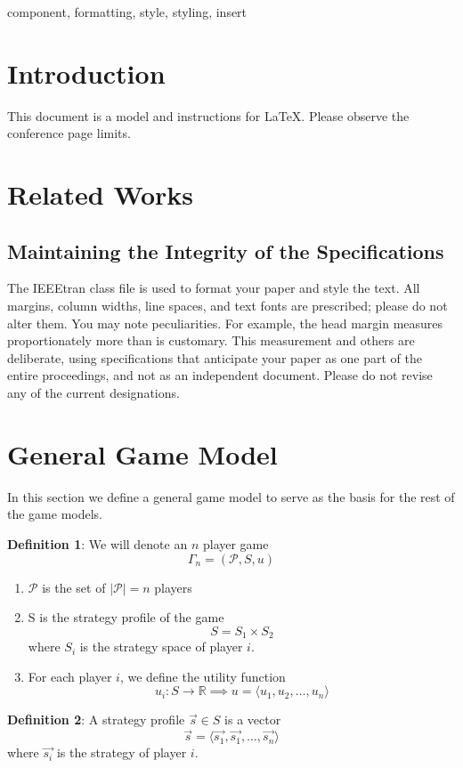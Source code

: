 \documentclass[conference]{IEEEtran}
\begin{document}
\begin{IEEEkeywords}
component, formatting, style, styling, insert
\end{IEEEkeywords}

\section{Introduction}
This document is a model and instructions for \LaTeX.
Please observe the conference page limits. 

\section{Related Works}

\subsection{Maintaining the Integrity of the Specifications}

The IEEEtran class file is used to format your paper and style the text. All margins, 
column widths, line spaces, and text fonts are prescribed; please do not 
alter them. You may note peculiarities. For example, the head margin
measures proportionately more than is customary. This measurement 
and others are deliberate, using specifications that anticipate your paper 
as one part of the entire proceedings, and not as an independent document. 
Please do not revise any of the current designations.
\fi
\section{General Game Model}
In this section we define a general game model to serve as the basis for the rest of the game models.

\textbf{Definition 1}: We will denote an $n$ player game $$\Gamma_n = (\mathcal{P}, S, u)$$
\begin{enumerate}
\item $\mathcal{P}$ is the set of $|\mathcal{P}| = n$ players
\item S is the strategy profile of the game $$S = S_1 \times S_2 $$ where $S_i$ is the strategy space of player $i$.
\item For each player $i$, we define the utility function $$u_i \mathpunct{:} S \to \mathbb{R} \implies u = \langle u_1, u_2, \ldots, u_n \rangle$$

\end{enumerate}

\textbf{Definition 2}: A strategy profile $\vec{s} \in S$ is a vector $$\vec{s} = \langle\vec{s_1}, \vec{s_1}, \ldots, \vec{s_n}\rangle$$ where $\vec{s_i}$ is the strategy of player $i$.
\end{document}

